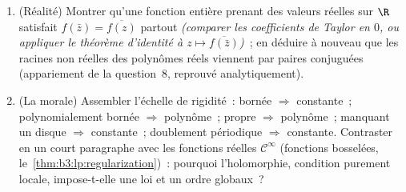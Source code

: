 \begin{problem}
\begin{enumerate}[resume]
        $\zeta(2k)$ dans le~\cref{ch:b3:residues}.
  \item (Réalité) Montrer qu'une fonction entière prenant des
        valeurs réelles sur $\R$ satisfait $f(\bar z) =
        \overline{f(z)}$ partout \emph{(comparer les
        coefficients de Taylor en $0$, ou appliquer le
        théorème d'identité à $z \mapsto
        \overline{f(\bar z)}$)}~; en déduire à nouveau que
        les racines non réelles des polynômes réels viennent
        par paires conjuguées (appariement de la question~8,
        reprouvé analytiquement).
  \item (La morale) Assembler l'échelle de rigidité~: bornée
        $\Rightarrow$ constante~; polynomialement bornée
        $\Rightarrow$ polynôme~; propre $\Rightarrow$
        polynôme~; manquant un disque $\Rightarrow$
        constante~; doublement périodique $\Rightarrow$
        constante. Contraster en un court paragraphe avec les
        fonctions réelles $\mathcal C^\infty$ (fonctions
        bosselées, le~\cref{thm:b3:lp:regularization})~:
        pourquoi l'holomorphie, condition purement locale,
        impose-t-elle une loi et un ordre globaux~?
\end{enumerate}


\end{problem}
